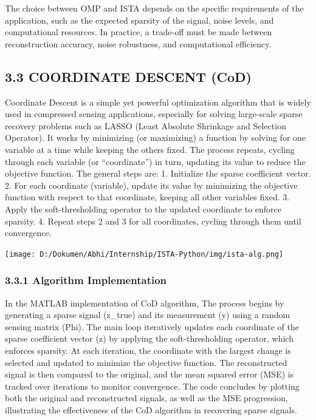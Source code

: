 \documentclass[
  letterpaper,
  DIV=11,
  numbers=noendperiod]{scrartcl}
\begin{document}
The choice between OMP and ISTA depends on the specific requirements of
the application, such as the expected sparsity of the signal, noise
levels, and computational resources. In practice, a trade-off must be
made between reconstruction accuracy, noise robustness, and
computational efficiency.

\subsection{3.3 COORDINATE DESCENT (CoD)}\label{coordinate-descent-cod}

Coordinate Descent is a simple yet powerful optimization algorithm that
is widely used in compressed sensing applications, especially for
solving large-scale sparse recovery problems such as LASSO (Least
Absolute Shrinkage and Selection Operator). It works by minimizing (or
maximizing) a function by solving for one variable at a time while
keeping the others fixed. The process repeats, cycling through each
variable (or ``coordinate'') in turn, updating its value to reduce the
objective function. The general steps are: 1. Initialize the sparse
coefficient vector. 2. For each coordinate (variable), update its value
by minimizing the objective function with respect to that coordinate,
keeping all other variables fixed. 3. Apply the soft-thresholding
operator to the updated coordinate to enforce sparsity. 4. Repeat steps
2 and 3 for all coordinates, cycling through them until convergence.

\begin{center}
\texttt{[image: D:/Dokumen/Abhi/Internship/ISTA-Python/img/ista-alg.png]}
\end{center}

\subsubsection{3.3.1 Algorithm
Implementation}\label{algorithm-implementation-1}

In the MATLAB implementation of CoD algorithm, The process begins by
generating a sparse signal (z\_true) and its measurement (y) using a
random sensing matrix (Phi). The main loop iteratively updates each
coordinate of the sparse coefficient vector (z) by applying the
soft-thresholding operator, which enforces sparsity. At each iteration,
the coordinate with the largest change is selected and updated to
minimize the objective function. The reconstructed signal is then
compared to the original, and the mean squared error (MSE) is tracked
over iterations to monitor convergence. The code concludes by plotting
both the original and reconstructed signals, as well as the MSE
progression, illustrating the effectiveness of the CoD algorithm in
recovering sparse signals.
\end{document}
